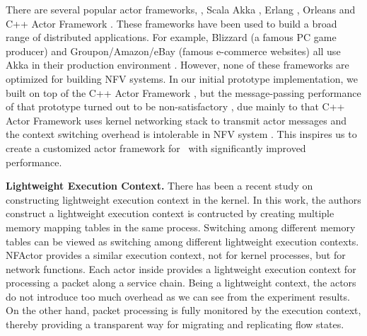 
There are several popular actor frameworks, \eg, Scala Akka \cite{akka}, Erlang \cite{erlang}, Orleans \cite{Orleans} and C++ Actor Framework \cite{caf}. These frameworks have been used to build a broad range of distributed applications. %
 For example, Blizzard (a famous PC game producer) and Groupon/Amazon/eBay (famous e-commerce websites) all use Akka in their production environment \cite{akka}. However, none of these frameworks are optimized for building NFV systems. In our initial prototype implementation, we built \nfactor on top of the C++ Actor Framework \cite{caf}, but the message-passing performance of that prototype turned out to be non-satisfactory , due mainly to \ac{that C++ Actor Framework uses kernel networking stack to transmit actor messages and the context switching overhead is intolerable in NFV system} \cite{martins2014clickos}. This inspires us to create a customized actor framework for \nfactor~with  significantly improved performance.

\textbf{Lightweight Execution Context.}
There has been a recent study on constructing lightweight execution context \cite{litton2016light} in the kernel. In this work, the authors construct a lightweight execution context is contructed by creating multiple memory mapping tables in the same process. Switching among different memory tables can be viewed as switching among different lightweight execution contexts. NFActor provides a similar execution context, not for kernel processes, but for network functions. Each actor inside \nfactor provides a lightweight execution context for processing a packet along a service chain. Being a lightweight context, the actors do not introduce too much overhead as we can see from the experiment results. On the other hand, packet processing is fully monitored by the execution context, thereby providing a transparent way for migrating and replicating flow states.
